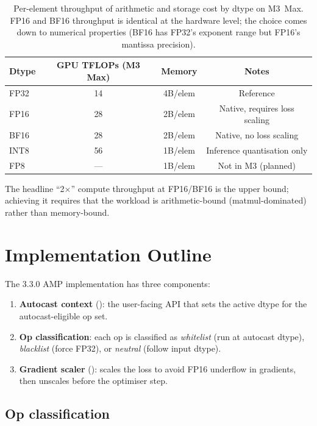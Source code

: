 \begin{table}[t]
\centering
\small
\begin{tabular}{lccc}
\toprule
Dtype  & GPU TFLOPs (M3 Max) & Memory & Notes \\
\midrule
FP32 & 14   & 4B/elem  & Reference \\
FP16 & 28   & 2B/elem  & Native, requires loss scaling \\
BF16 & 28   & 2B/elem  & Native, no loss scaling \\
INT8 & 56   & 1B/elem  & Inference quantisation only \\
FP8  & ---  & 1B/elem  & Not in M3 (planned) \\
\bottomrule
\end{tabular}
\caption[Apple-silicon dtype throughput.]{Per-element throughput
of arithmetic and storage cost by dtype on M3~Max. FP16 and
BF16 throughput is identical at the hardware level; the choice
comes down to numerical properties (BF16 has FP32's exponent
range but FP16's mantissa precision).}
\label{tab:amp_integration:dtype_matrix}
\end{table}

The headline ``2$\times$'' compute throughput at FP16/BF16 is
the upper bound; achieving it requires that the workload is
arithmetic-bound (matmul-dominated) rather than memory-bound.

\section{Implementation Outline}
\label{sec:amp_integration:impl_outline}

The 3.3.0 AMP implementation has three components:

\begin{enumerate}
  \item \textbf{Autocast context}
    (): the user-facing API that
    sets the active dtype for the autocast-eligible op set.
  \item \textbf{Op classification}: each op is classified as
    \emph{whitelist} (run at autocast dtype), \emph{blacklist}
    (force FP32), or \emph{neutral} (follow input dtype).
  \item \textbf{Gradient scaler}
    (): scales the loss to
    avoid FP16 underflow in gradients, then unscales before the
    optimiser step.
\end{enumerate}

\subsection{Op classification}
\label{ssec:amp_integration:op_class}

